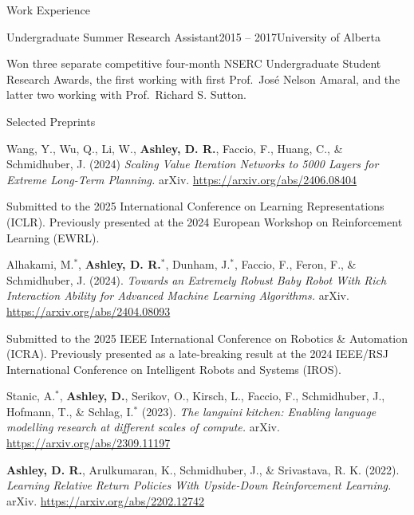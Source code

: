 \documentclass{cv}
\begin{document}
\begin{rSection}{Work Experience}
\begin{rSubsection}{Undergraduate Summer Research Assistant}{2015 -- 2017}{University of Alberta}
    \item Won three separate competitive four-month NSERC Undergraduate Student Research Awards, the first working with first Prof.\ Jos{\'{e}} Nelson Amaral, and the latter two working with Prof.\ Richard S. Sutton.
\end{rSubsection}

\end{rSection}


\begin{rSection}{Selected Preprints}

\begin{rPublications}
    \item
        Wang, Y., Wu, Q., Li, W., \textbf{Ashley, D. R.}, Faccio, F., Huang, C., \& Schmidhuber, J.
        (2024)
        \textit{Scaling Value Iteration Networks to 5000 Layers for Extreme Long-Term Planning.}
        arXiv.
        \url{https://arxiv.org/abs/2406.08404}

        \vspace{-0.4em} Submitted to the 2025 International Conference on Learning Representations (ICLR). Previously presented at the 2024 European Workshop on Reinforcement Learning (EWRL).
    \item
        Alhakami, M.$^*$, \textbf{Ashley, D. R.}$^*$, Dunham, J.$^*$, Faccio, F., Feron, F., \& Schmidhuber, J.
        (2024).
        \textit{Towards an Extremely Robust Baby Robot With Rich Interaction Ability for Advanced Machine Learning Algorithms.}
        arXiv.
        \url{https://arxiv.org/abs/2404.08093}

        \vspace{-0.4em} Submitted to the 2025 IEEE International Conference on Robotics \& Automation (ICRA). Previously presented as a late-breaking result at the 2024 IEEE/RSJ International Conference on Intelligent Robots and Systems (IROS).
    \item
        Stanic, A.$^*$, \textbf{Ashley, D.}, Serikov, O., Kirsch, L., Faccio, F., Schmidhuber, J., Hofmann, T., \& Schlag, I.$^*$
        (2023).
        \textit{The languini kitchen: Enabling language modelling research at different scales of compute.}
        arXiv.
        \url{https://arxiv.org/abs/2309.11197}
    \item
        \textbf{Ashley, D. R.}, Arulkumaran, K., Schmidhuber, J., \& Srivastava, R. K.
        (2022).
        \textit{Learning Relative Return Policies With Upside-Down Reinforcement Learning.}
        arXiv.
        \url{https://arxiv.org/abs/2202.12742}


\end{rPublications}
\end{rSection}
\end{document}
